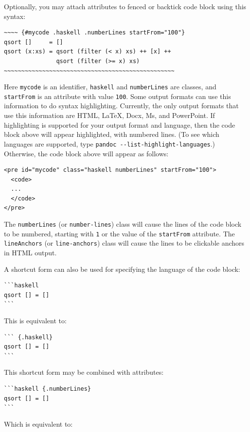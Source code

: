 \documentclass[
]{article}
\begin{document}
Optionally, you may attach attributes to fenced or backtick code block
using this syntax:

\begin{verbatim}
~~~~ {#mycode .haskell .numberLines startFrom="100"}
qsort []     = []
qsort (x:xs) = qsort (filter (< x) xs) ++ [x] ++
               qsort (filter (>= x) xs)
~~~~~~~~~~~~~~~~~~~~~~~~~~~~~~~~~~~~~~~~~~~~~~~~~
\end{verbatim}

Here \texttt{mycode} is an identifier, \texttt{haskell} and
\texttt{numberLines} are classes, and \texttt{startFrom} is an attribute
with value \texttt{100}. Some output formats can use this information to
do syntax highlighting. Currently, the only output formats that use this
information are HTML, LaTeX, Docx, Ms, and PowerPoint. If highlighting
is supported for your output format and language, then the code block
above will appear highlighted, with numbered lines. (To see which
languages are supported, type
\texttt{pandoc\ -\/-list-highlight-languages}.) Otherwise, the code
block above will appear as follows:

\begin{verbatim}
<pre id="mycode" class="haskell numberLines" startFrom="100">
  <code>
  ...
  </code>
</pre>
\end{verbatim}

The \texttt{numberLines} (or \texttt{number-lines}) class will cause the
lines of the code block to be numbered, starting with \texttt{1} or the
value of the \texttt{startFrom} attribute. The \texttt{lineAnchors} (or
\texttt{line-anchors}) class will cause the lines to be clickable
anchors in HTML output.

A shortcut form can also be used for specifying the language of the code
block:

\begin{verbatim}
```haskell
qsort [] = []
```
\end{verbatim}

This is equivalent to:

\begin{verbatim}
``` {.haskell}
qsort [] = []
```
\end{verbatim}

This shortcut form may be combined with attributes:

\begin{verbatim}
```haskell {.numberLines}
qsort [] = []
```
\end{verbatim}

Which is equivalent to:
\end{document}
